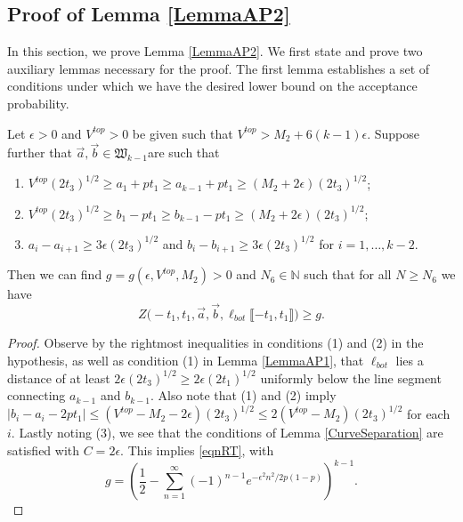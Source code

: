\subsection{Proof of Lemma \ref{LemmaAP2}} \label{sect62} In this section, we prove Lemma \ref{LemmaAP2}. We first state and prove two auxiliary lemmas necessary for the proof. The first lemma establishes a set of conditions under which we have the desired lower bound on the acceptance probability. 

\begin{lemma}\label{LemmaBP1} Let $\epsilon > 0$ and $V^{top} > 0$ be given such that $V^{top} > M_2 + 6 (k-1) \epsilon$. Suppose further that $\vec{a}, \vec{b} \in \mathfrak{W}_{k-1}$are such that 
	\begin{enumerate}
		\item $V^{top} (2t_3)^{1/2} \geq a_1 + p t_1 \geq a_{k-1} + pt_1 \geq (M_2 + 2 \epsilon) (2t_3)^{1/2}$;
		\item $V^{top} (2t_3)^{1/2} \geq b_1 - p t_1 \geq b_{k-1} - pt_1 \geq (M_2 + 2 \epsilon) (2t_3)^{1/2}$; 
		\item $a_i -a_{i+1} \geq 3\epsilon (2t_3)^{1/2}$ and $b_{i} - b_{i+1} \geq 3 \epsilon (2t_3)^{1/2}$ for $i = 1, \dots, k-2$.
	\end{enumerate}
	Then we can find $g = g(\epsilon, V^{top}, M_2) > 0$ and $N_6 \in \mathbb{N}$ such that for all $N \geq N_6$ we have 
	\begin{equation}\label{eqnRT}
	Z\big(  -t_1, t_1, \vec{a} ,\vec{b}, \ell_{bot}\llbracket -t_1, t_1\rrbracket\big) \geq g.
	\end{equation}
\end{lemma}

\begin{proof}
	
	Observe by the rightmost inequalities in conditions (1) and (2) in the hypothesis, as well as condition (1) in Lemma \ref{LemmaAP1}, that $\ell_{bot}$ lies a distance of at least $2\epsilon(2t_3)^{1/2} \geq 2\epsilon(2t_1)^{1/2}$ uniformly below the line segment connecting $a_{k-1}$ and $b_{k-1}$. Also note that (1) and (2) imply $|b_i-a_i-2pt_1| \leq (V^{top} - M_2-2\epsilon)(2t_3)^{1/2} \leq 2(V^{top} - M_2)(2t_3)^{1/2}$ for each $i$. Lastly noting (3), we see that the conditions of Lemma \ref{CurveSeparation} are satisfied with $C = 2\epsilon$. This implies \eqref{eqnRT}, with
	\[
	g = \left( \frac{1}{2} - \sum_{n=1}^\infty (-1)^{n-1} e^{-\epsilon^2n^2/2p(1-p)}\right)^{k-1}.
	\]
	
\end{proof}

